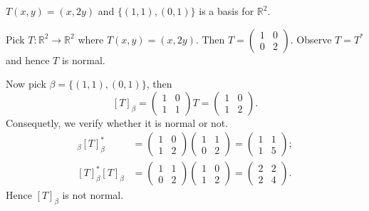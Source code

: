 \begin{Exercise}
\begin{answer}
$T(x,y) = (x, 2y)$ and $\{(1,1),(0,1)\}$ is a basis for $\mathbb{R}^2$.
\end{answer}
\begin{solution}
Pick $T:\mathbb{R}^2\to \mathbb{R}^2$ where $T(x,y) = (x,2y)$. Then $T = \begin{pmatrix}
1 & 0 \\
0 & 2 
\end{pmatrix}$. Observe $T = T^*$ and hence $T$ is normal.

Now pick $\beta = \{(1,1),(0,1)\}$, then
$$
[T]_{\beta} = \begin{pmatrix}
1 & 0 \\
1 & 1
\end{pmatrix} T = \begin{pmatrix}
1 & 0 \\
1 & 2
\end{pmatrix}.
$$
Consequetly, we verify whether it is normal or not.
\begin{align*}
[T]_{\beta} [T]_{\beta}^* &= \begin{pmatrix}
1 & 0 \\
1 & 2
\end{pmatrix} \begin{pmatrix}
1 & 1 \\
0 & 2
\end{pmatrix} = \begin{pmatrix}
1 & 1 \\
1 & 5
\end{pmatrix}; \\
[T]_{\beta}^* [T]_{\beta} &= \begin{pmatrix}
1 & 1 \\
0 & 2
\end{pmatrix} \begin{pmatrix}
1 & 0 \\
1 & 2
\end{pmatrix} = \begin{pmatrix}
2 & 2 \\
2 & 4
\end{pmatrix}.
\end{align*}
Hence $[T]_{\beta}$ is not normal.
\end{solution}
\end{Exercise}